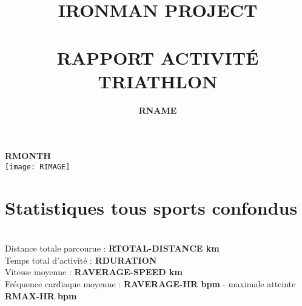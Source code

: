 \documentclass[a4paper,french,11pt]{report}
\title{	\normalsize \textsc{\uppercase{ironman project}}
		 	\\[1.2cm]
			\HRule{0.7pt} \\
			\vspace{0.5cm}
			\LARGE \textbf{\uppercase{rapport activité triathlon}}	%
			\HRule{1pt} \\
			\vspace{1.7cm}
		}
\author{
		\textbf{RNAME}\\
}
\makeatletter
\def\printtitle{%
    {\centering \@title\par}}
\def\printauthor{%
    {\centering \large \@author}}
\makeatother
\begin{document}

\thispagestyle{empty}		%

\printtitle					%
\printauthor				%
\vspace{1cm}

\begin{center}

\LARGE{\textbf{RMONTH}}\\
\vspace{4cm}
\texttt{[image: RIMAGE]}\\

\end{center}

\newpage



\section*{Statistiques tous sports confondus}


\\
\textbullet Distance totale parcourue : \textbf{RTOTAL-DISTANCE km} \\
\textbullet Temps total d'activité : \textbf{RDURATION} \\
\textbullet Vitesse moyenne : \textbf{RAVERAGE-SPEED km} \\
\textbullet Fréquence cardiaque moyenne : \textbf{RAVERAGE-HR bpm} - maximale atteinte \textbf{RMAX-HR bpm}\\
\end{document}
